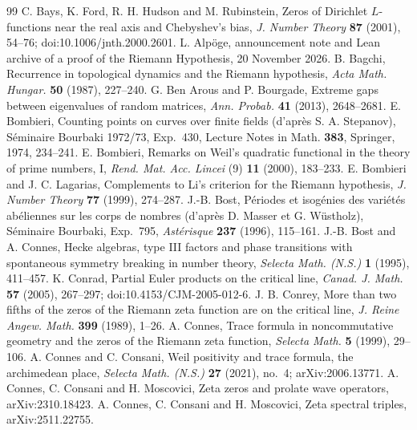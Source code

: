 \documentclass[11pt,a4paper]{article}
\theoremstyle{definition}\newtheorem{definition}[proposition]{Definition}
\theoremstyle{remark}\newtheorem{remark}[proposition]{Remark}
\begin{document}
\begingroup\small
\begin{thebibliography}{99}
 C. Bays, K. Ford, R. H. Hudson and M. Rubinstein, Zeros of Dirichlet $L$-functions near the real axis and Chebyshev's bias, \emph{J. Number Theory} \textbf{87} (2001), 54--76; doi:10.1006/jnth.2000.2601.
 L. Alp\"oge, announcement note and Lean archive of a proof of the Riemann Hypothesis, 20 November 2026.
 B. Bagchi, Recurrence in topological dynamics and the Riemann hypothesis, \emph{Acta Math. Hungar.} \textbf{50} (1987), 227--240.
 G. Ben Arous and P. Bourgade, Extreme gaps between eigenvalues of random matrices, \emph{Ann. Probab.} \textbf{41} (2013), 2648--2681.
 E. Bombieri, Counting points on curves over finite fields (d'apr\`es S. A. Stepanov), S\'eminaire Bourbaki 1972/73, Exp.~430, Lecture Notes in Math. \textbf{383}, Springer, 1974, 234--241.
 E. Bombieri, Remarks on Weil's quadratic functional in the theory of prime numbers, I, \emph{Rend. Mat. Acc. Lincei} (9) \textbf{11} (2000), 183--233.
 E. Bombieri and J. C. Lagarias, Complements to Li's criterion for the Riemann hypothesis, \emph{J. Number Theory} \textbf{77} (1999), 274--287.
 J.-B. Bost, P\'eriodes et isog\'enies des vari\'et\'es ab\'eliennes sur les corps de nombres (d'apr\`es D. Masser et G. W\"ustholz), S\'eminaire Bourbaki, Exp.~795, \emph{Ast\'erisque} \textbf{237} (1996), 115--161.
 J.-B. Bost and A. Connes, Hecke algebras, type III factors and phase transitions with spontaneous symmetry breaking in number theory, \emph{Selecta Math. (N.S.)} \textbf{1} (1995), 411--457.
 K. Conrad, Partial Euler products on the critical line, \emph{Canad. J. Math.} \textbf{57} (2005), 267--297; doi:10.4153/CJM-2005-012-6.
 J. B. Conrey, More than two fifths of the zeros of the Riemann zeta function are on the critical line, \emph{J. Reine Angew. Math.} \textbf{399} (1989), 1--26.
 A. Connes, Trace formula in noncommutative geometry and the zeros of the Riemann zeta function, \emph{Selecta Math.} \textbf{5} (1999), 29--106.
 A. Connes and C. Consani, Weil positivity and trace formula, the archimedean place, \emph{Selecta Math. (N.S.)} \textbf{27} (2021), no.~4; arXiv:2006.13771.
 A. Connes, C. Consani and H. Moscovici, Zeta zeros and prolate wave operators, arXiv:2310.18423.
 A. Connes, C. Consani and H. Moscovici, Zeta spectral triples, arXiv:2511.22755.

\end{thebibliography}
\end{document}
